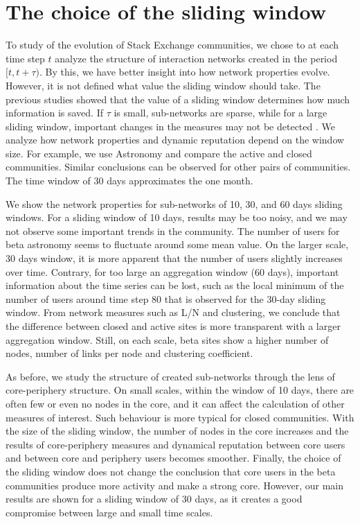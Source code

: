 \chapter{The choice of the sliding window} %

To study of the evolution of Stack Exchange communities, we chose to at each time step $t$ analyze the structure of interaction networks created in the period $[t, t+\tau)$. By this, we have better insight into how network properties evolve. However, it is not defined what value the sliding window should take. The previous studies showed that the value of a sliding window determines how much information is saved. If $\tau$ is small, sub-networks are sparse, while for a large sliding window, important changes in the measures may not be detected \cite{krings2012effects, arnold2021moving}. We analyze how network properties and dynamic reputation depend on the window size. For example, we use Astronomy and compare the active and closed communities. Similar conclusions can be observed for other pairs of communities. The time window of 30 days approximates the one month.  

We show the network properties for sub-networks of 10, 30, and 60 days sliding windows. For a sliding window of 10 days, results may be too noisy, and we may not observe some important trends in the community. The number of users for beta astronomy seems to fluctuate around some mean value. On the larger scale, 30 days window,  it is more apparent that the number of users slightly increases over time. Contrary, for too large an aggregation window (60 days), important information about the time series can be lost, such as the local minimum of the number of users around time step 80 that is observed for the 30-day sliding window. 
From network measures such as L/N and clustering, we conclude that the difference between closed and active sites is more transparent with a larger aggregation window. Still, on each scale, beta sites show a higher number of nodes, number of links per node and clustering coefficient.

As before, we study the structure of created sub-networks through the lens of core-periphery structure. On small scales, within the window of 10 days, there are often few or even no nodes in the core, and it can affect the calculation of other measures of interest. Such behaviour is more typical for closed communities. With the size of the sliding window, the number of nodes in the core increases and the results of core-periphery measures and dynamical reputation between core users and between core and periphery users becomes smoother. Finally, the choice of the sliding window does not change the conclusion that core users in the beta communities produce more activity and make a strong core. However, our main results are shown for a sliding window of 30 days, as it creates a good compromise between large and small time scales.   

